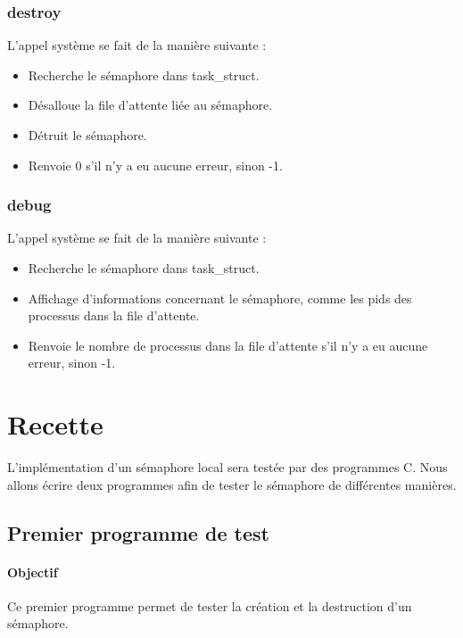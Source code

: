\documentclass[12pt]{article}
\begin{document}
      \subsubsection{destroy}
        L'appel système se fait de la manière suivante :
          \begin{itemize}
            \item Recherche le sémaphore dans task\_struct.
            \item Désalloue la file d'attente liée au sémaphore.
            \item Détruit le sémaphore.
            \item Renvoie 0 s'il n'y a eu aucune erreur, sinon -1.
          \end{itemize}
      \subsubsection{debug}
        L'appel système se fait de la manière suivante :
          \begin{itemize}
            \item Recherche le sémaphore dans task\_struct.
            \item Affichage d'informations concernant le sémaphore, comme les pids des processus dans la file d'attente.
            \item Renvoie le nombre de processus dans la file d'attente s'il n'y a eu aucune erreur, sinon -1.
          \end{itemize}
\newpage
\section{Recette}
L'implémentation d'un sémaphore local sera testée par des programmes C. Nous allons écrire deux programmes afin de tester le sémaphore de différentes manières.
\subsection{Premier programme de test}
  \paragraph{Objectif\\}
  Ce premier programme permet de tester la création et la destruction d'un sémaphore.
\end{document}
